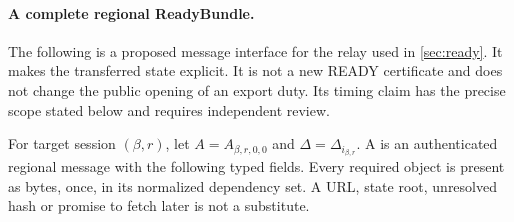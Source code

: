 \paragraph{A complete regional ReadyBundle.}
\label{sec:ready-bundle}
The following is a proposed message interface for the relay used in
\cref{sec:ready}. It makes the transferred state explicit. It is not
a new READY certificate and does not change the public opening of an
export duty. Its timing claim has the precise scope stated below and
requires independent review.

For target session $(\beta,r)$, let $A=A_{\beta,r,0,0}$ and
$\Delta=\Delta_{i_{\beta,r}}$. A  is an authenticated
regional message with the following typed fields. Every required object
is present as bytes, once, in its normalized dependency set. A URL,
state root, unresolved hash or promise to fetch later is not a substitute.
